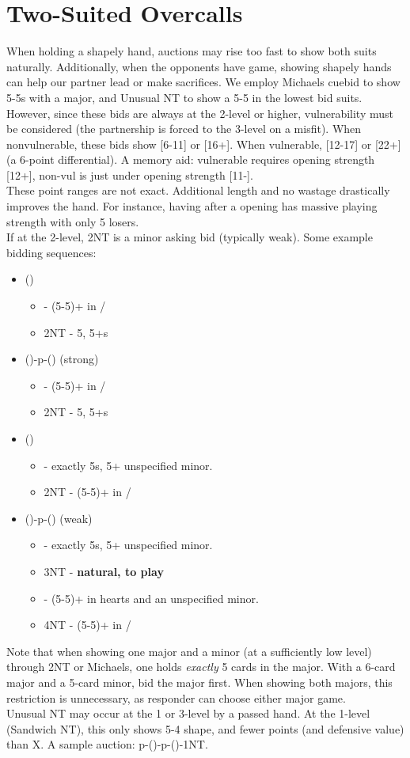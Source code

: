 \documentclass[12pt]{report}
\newcommand{\n}{\\}
\newcommand{\q}[1]{\multido{}{#1}{\qquad}}
\newcommand{\ul}[1]{\begin{itemize}#1\end{itemize}}
\newcommand{\li}[1]{\item[~] \q{#1}}
\begin{document}
\section{Two-Suited Overcalls} \label{4:6}

    When holding a shapely hand, auctions may rise too fast to show both suits naturally.  Additionally, when the opponents have game, showing shapely hands can help our partner lead or make sacrifices.  We employ Michaels cuebid to show 5-5s with a major, and Unusual NT to show a 5-5 in the lowest bid suits. \n

    However, since these bids are always at the 2-level or higher, vulnerability must be considered (the partnership is forced to the 3-level on a misfit).  When nonvulnerable, these bids show [6-11] or [16+].  When vulnerable, [12-17] or [22+] (a 6-point differential).  A memory aid: vulnerable requires opening strength [12+], non-vul is just under opening strength [11-]. \n
    
    These point ranges are not exact.  Additional length and no wastage drastically improves the hand.  For instance, having   \di{}  after a  opening has massive playing strength with only 5 losers.\n
    
    If at the 2-level, 2NT is a minor asking bid (typically weak).  Some example bidding sequences:

    \ul {
        \li0 ()
        \ul {
            \li0  - (5-5)+ in \he{}/\sp{}
            \li0 2NT - 5\he{}, 5+\di{}s
        }
        \li0 (\di1)-p-(\di2) (strong)
        \ul {
            \li0 \di3 - (5-5)+ in \he{}/\sp{}
            \li0 2NT - 5\he{}, 5+\cl{}s
        }
        \li0 (\he1)
        \ul {
            \li0 \sp2 - exactly 5\sp{}s, 5+ unspecified minor.
            \li0 2NT - (5-5)+ in \cl{}/\di{}
        }
        \li0 (\sp1)-p-(\sp3) (weak)
        \ul {
            \li0 \sp2 - exactly 5\he{}s, 5+ unspecified minor.
            \li0 3NT - \textbf{natural, to play}
            \li0 \sp4 - (5-5)+ in hearts and an unspecified minor.
            \li0 4NT - (5-5)+ in \cl{}/\di{}
        }
    }

    Note that when showing one major and a minor (at a sufficiently low level) through 2NT or Michaels, one holds \textit{exactly} 5 cards in the major.  With a 6-card major and a 5-card minor, bid the major first.  When showing both majors, this restriction is unnecessary, as responder can choose either major game. \n

    Unusual NT may occur at the 1 or 3-level by a passed hand.  At the 1-level (Sandwich NT), this only shows 5-4 shape, and fewer points (and defensive value) than X.  A sample auction: p-()-p-()-1NT.
\end{document}
